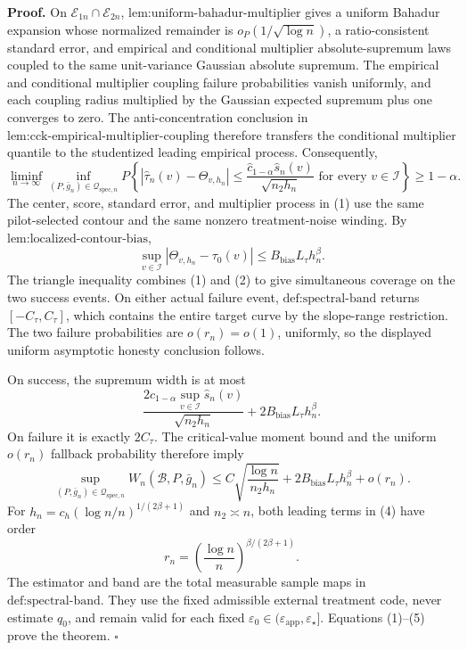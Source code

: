 \textbf{Proof.}
On \(\mathcal E_{1n}\cap\mathcal E_{2n}\), \(\text{lem:uniform-bahadur-multiplier}\) gives a uniform Bahadur expansion whose normalized remainder is \(o_P(1/\sqrt{\log n})\), a ratio-consistent standard error, and empirical and conditional multiplier absolute-supremum laws coupled to the same unit-variance Gaussian absolute supremum.  The empirical and conditional multiplier coupling failure probabilities vanish uniformly, and each coupling radius multiplied by the Gaussian expected supremum plus one converges to zero.  The anti-concentration conclusion in \(\text{lem:cck-empirical-multiplier-coupling}\) therefore transfers the conditional multiplier quantile to the studentized leading empirical process.  Consequently,
\[
 \liminf_{n\to\infty}\inf_{(P,\bar g_n)\in\mathcal Q_{\mathrm{spec},n}}
 P\left\{
 |\widehat\tau_n(v)-\Theta_{v,h_n}|
 \le\frac{\widehat c_{1-\alpha}\widehat s_n(v)}{\sqrt{n_2h_n}}
 \text{ for every }v\in\mathcal I
 \right\}\ge1-\alpha. \tag{1}
\]
The center, score, standard error, and multiplier process in (1) use the same pilot-selected contour and the same nonzero treatment-noise winding.  By \(\text{lem:localized-contour-bias}\),
\[
 \sup_{v\in\mathcal I}|\Theta_{v,h_n}-\tau_0(v)|
 \le B_{\mathrm{bias}}L_\tau h_n^\beta. \tag{2}
\]
The triangle inequality combines (1) and (2) to give simultaneous coverage on the two success events.  On either actual failure event, \(\text{def:spectral-band}\) returns \([-C_\tau,C_\tau]\), which contains the entire target curve by the slope-range restriction.  The two failure probabilities are \(o(r_n)=o(1)\), uniformly, so the displayed uniform asymptotic honesty conclusion follows.

On success, the supremum width is at most
\[
 \frac{2\widehat c_{1-\alpha}\sup_{v\in\mathcal I}\widehat s_n(v)}{\sqrt{n_2h_n}}
 +2B_{\mathrm{bias}}L_\tau h_n^\beta. \tag{3}
\]
On failure it is exactly \(2C_\tau\).  The critical-value moment bound and the uniform \(o(r_n)\) fallback probability therefore imply
\[
 \sup_{(P,\bar g_n)\in\mathcal Q_{\mathrm{spec},n}}
 W_n(\mathcal B,P,\bar g_n)
 \le C\sqrt{\frac{\log n}{n_2h_n}}
 +2B_{\mathrm{bias}}L_\tau h_n^\beta+o(r_n). \tag{4}
\]
For \(h_n=c_h(\log n/n)^{1/(2\beta+1)}\) and \(n_2\asymp n\), both leading terms in (4) have order
\[
 r_n=\left(\frac{\log n}{n}\right)^{\beta/(2\beta+1)}. \tag{5}
\]
The estimator and band are the total measurable sample maps in \(\text{def:spectral-band}\).  They use the fixed admissible external treatment code, never estimate \(q_0\), and remain valid for each fixed \(\varepsilon_0\in(\varepsilon_{\mathrm{app}},\varepsilon_\star]\).  Equations (1)--(5) prove the theorem. \(\square\)